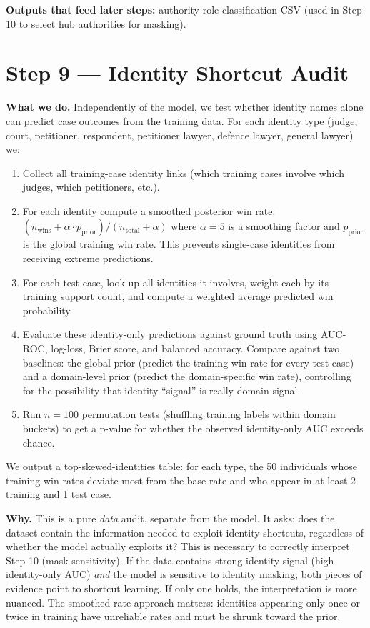 \documentclass[11pt,a4paper]{article}
\begin{document}
\textbf{Outputs that feed later steps:} authority role classification CSV (used in
Step 10 to select hub authorities for masking).

\bigskip

\section{Step 9 \texorpdfstring{\textcolor{stepgray}{---}}{---} Identity Shortcut Audit}

\textbf{What we do.}
Independently of the model, we test whether identity names alone can predict case
outcomes from the training data. For each identity type (judge, court, petitioner,
respondent, petitioner lawyer, defence lawyer, general lawyer) we:
\begin{enumerate}
  \item Collect all training-case identity links (which training cases involve which
    judges, which petitioners, etc.).
  \item For each identity compute a smoothed posterior win rate:
    $(n_{\text{wins}} + \alpha \cdot p_{\text{prior}}) / (n_{\text{total}} + \alpha)$
    where $\alpha = 5$ is a smoothing factor and $p_{\text{prior}}$ is the global
    training win rate. This prevents single-case identities from receiving extreme
    predictions.
  \item For each test case, look up all identities it involves, weight each by its
    training support count, and compute a weighted average predicted win probability.
  \item Evaluate these identity-only predictions against ground truth using AUC-ROC,
    log-loss, Brier score, and balanced accuracy. Compare against two baselines: the
    global prior (predict the training win rate for every test case) and a domain-level
    prior (predict the domain-specific win rate), controlling for the possibility that
    identity ``signal'' is really domain signal.
  \item Run $n=100$ permutation tests (shuffling training labels within domain buckets)
    to get a p-value for whether the observed identity-only AUC exceeds chance.
\end{enumerate}
We output a top-skewed-identities table: for each type, the 50 individuals whose
training win rates deviate most from the base rate and who appear in at least 2
training and 1 test case.

\textbf{Why.}
This is a pure \emph{data} audit, separate from the model. It asks: does the dataset
contain the information needed to exploit identity shortcuts, regardless of whether the
model actually exploits it? This is necessary to correctly interpret Step 10 (mask
sensitivity). If the data contains strong identity signal (high identity-only AUC)
\emph{and} the model is sensitive to identity masking, both pieces of evidence point
to shortcut learning. If only one holds, the interpretation is more nuanced. The
smoothed-rate approach matters: identities appearing only once or twice in training
have unreliable rates and must be shrunk toward the prior.
\end{document}
